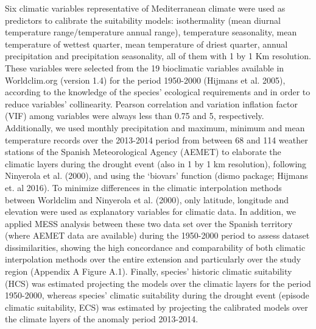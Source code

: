 \documentclass[11pt,twoside]{reedthesis}
\begin{document}
Six climatic variables representative of Mediterranean climate were used
as predictors to calibrate the suitability models: isothermality (mean
diurnal temperature range/temperature annual range), temperature
seasonality, mean temperature of wettest quarter, mean temperature of
driest quarter, annual precipitation and precipitation seasonality, all
of them with 1 by 1 Km resolution. These variables were selected from
the 19 bioclimatic variables available in Worldclim.org (version 1.4)
for the period 1950-2000 (Hijmans et al. 2005), according to the
knowledge of the species' ecological requirements and in order to reduce
variables' collinearity. Pearson correlation and variation inflation
factor (VIF) among variables were always less than 0.75 and 5,
respectively. Additionally, we used monthly precipitation and maximum,
minimum and mean temperature records over the 2013-2014 period from
between 68 and 114 weather stations of the Spanish Meteorological Agency
(AEMET) to elaborate the climatic layers during the drought event (also
in 1 by 1 km resolution), following Ninyerola et al. (2000), and using
the `biovars' function (dismo package; Hijmans et. al 2016). To minimize
differences in the climatic interpolation methods between Worldclim and
Ninyerola et al. (2000), only latitude, longitude and elevation were
used as explanatory variables for climatic data. In addition, we applied
MESS analysis between these two data set over the Spanish territory
(where AEMET data are available) during the 1950-2000 period to assess
dataset dissimilarities, showing the high concordance and comparability
of both climatic interpolation methods over the entire extension and
particularly over the study region (Appendix A Figure A.1). Finally,
species' historic climatic suitability (HCS) was estimated projecting
the models over the climatic layers for the period 1950-2000, whereas
species' climatic suitability during the drought event (episode climatic
suitability, ECS) was estimated by projecting the calibrated models over
the climate layers of the anomaly period 2013-2014.\par
\end{document}
